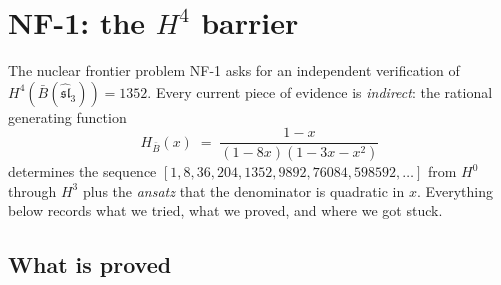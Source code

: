 \documentclass[11pt]{article}
\newcommand{\fsl}{\mathfrak{sl}}
\newcommand{\B}{\bar{B}}
\begin{document}
\section{NF-1: the $H^4$ barrier}
\label{sec:nf1-barrier}

The nuclear frontier problem NF-1 asks for an independent
verification of $H^4(\B(\widehat{\fsl}_3)) = 1352$.
Every current piece of evidence is \emph{indirect}: the rational
generating function
\[
  H_{\B}(x) \;=\; \frac{1-x}{(1-8x)(1-3x-x^2)}
\]
determines the sequence $[1,8,36,204,1352,9892,76084,598592,\ldots]$
from $H^0$ through $H^3$ plus the \emph{ansatz} that the denominator
is quadratic in $x$.  Everything below records what we tried, what
we proved, and where we got stuck.

\subsection{What is proved}
\end{document}
